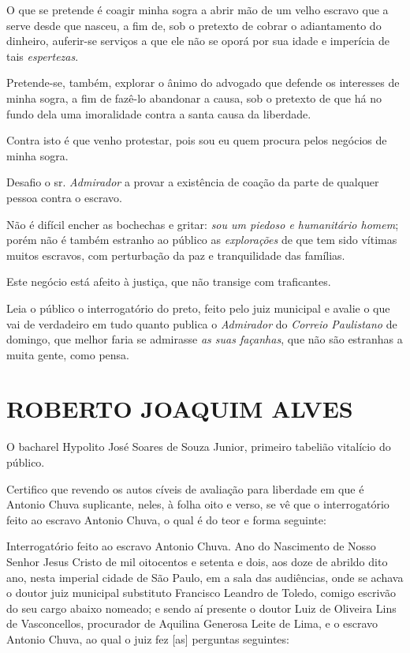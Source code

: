 O que se pretende é coagir minha sogra a abrir mão de um velho escravo
que a serve desde que nasceu, a fim de, sob o pretexto de cobrar o
adiantamento do dinheiro, auferir-se serviços a que ele não se oporá por
sua idade e imperícia de tais \emph{espertezas}.

Pretende-se, também, explorar o ânimo do advogado que defende os
interesses de minha sogra, a fim de fazê-lo abandonar a causa, sob o
pretexto de que há no fundo dela uma imoralidade contra a santa causa da
liberdade.

Contra isto é que venho protestar, pois sou eu quem procura pelos
negócios de minha sogra.

Desafio o sr. \emph{Admirador} a provar a existência de coação da parte
de qualquer pessoa contra o escravo.

Não é difícil encher as bochechas e gritar: \emph{sou um piedoso e
humanitário homem}; porém não é também estranho ao público as
\emph{explorações} de que tem sido vítimas muitos escravos, com
perturbação da paz e tranquilidade das famílias.

Este negócio está afeito à justiça, que não transige com traficantes.

Leia o público o interrogatório do preto, feito pelo juiz municipal e
avalie o que vai de verdadeiro em tudo quanto publica o \emph{Admirador}
do \emph{Correio Paulistano} de domingo, que melhor faria se admirasse
\emph{as suas façanhas}, que não são estranhas a muita gente, como
pensa.

\section{ROBERTO JOAQUIM ALVES}

\asterisc{}

O bacharel Hypolito José Soares de Souza Junior, primeiro tabelião
vitalício do público.

Certifico que revendo os autos cíveis de avaliação para liberdade em que
é Antonio Chuva suplicante, neles, à folha oito e verso, se vê que o
interrogatório feito ao escravo Antonio Chuva, o qual é do teor e forma
seguinte:

Interrogatório feito ao escravo Antonio Chuva. Ano do Nascimento de
Nosso Senhor Jesus Cristo de mil oitocentos e setenta e dois, aos doze
de abrildo dito ano, nesta imperial cidade de São Paulo, em a sala das
audiências, onde se achava o doutor juiz municipal substituto Francisco
Leandro de Toledo, comigo escrivão do seu cargo abaixo nomeado; e sendo
aí presente o doutor Luiz de Oliveira Lins de Vasconcellos, procurador
de Aquilina Generosa Leite de Lima, e o escravo Antonio Chuva, ao qual o
juiz fez {[}as{]} perguntas seguintes:

